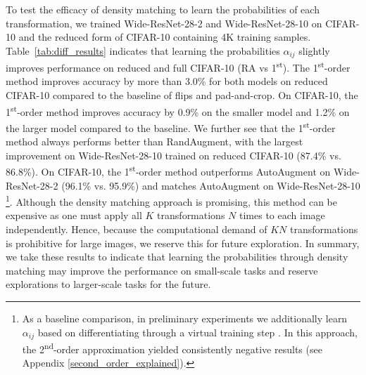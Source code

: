 To test the efficacy of density matching to learn the probabilities of each transformation, we trained Wide-ResNet-28-2 and Wide-ResNet-28-10 on CIFAR-10 and the reduced form of CIFAR-10 containing 4K training samples. Table~\ref{tab:diff_results} indicates that learning the probabilities $\alpha_{ij}$ slightly improves performance on
reduced and full CIFAR-10 (RA vs 1\textsuperscript{st}). The 1\textsuperscript{st}-order method improves accuracy by more than 3.0\% for both models on reduced CIFAR-10 compared to the baseline of flips and pad-and-crop. On CIFAR-10, the 1\textsuperscript{st}-order method improves accuracy by 0.9\% on the smaller model and 1.2\% on the larger model compared to the baseline. We further see that the 1\textsuperscript{st}-order method always performs better than RandAugment, with the largest improvement on Wide-ResNet-28-10 trained on reduced CIFAR-10 (87.4\% vs. 86.8\%). On CIFAR-10, the 1\textsuperscript{st}-order method outperforms AutoAugment on Wide-ResNet-28-2 (96.1\% vs. 95.9\%) and matches AutoAugment on Wide-ResNet-28-10 \footnote{As a baseline comparison, in preliminary experiments we additionally learn $\alpha_{ij}$  based on differentiating through a virtual training step \cite{liu2018darts}. In this approach, the 2\textsuperscript{nd}-order approximation yielded consistently negative results (see Appendix \ref{second_order_explained}).}.
Although the density matching approach is promising, this method can be expensive as one must apply all $K$ transformations $N$ times to each image independently. Hence, because the computational demand of $KN$ transformations is prohibitive for large images, we reserve this for future exploration.
In summary, we take these results to indicate that learning the probabilities through density matching may improve the performance on small-scale tasks and reserve explorations to larger-scale tasks for the future.
